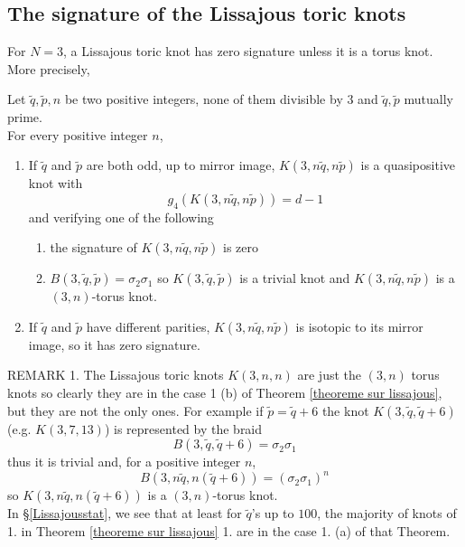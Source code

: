 \documentclass[12pt]{article}
\begin{document}
\subsection{The signature of the Lissajous toric knots}
For $N=3$, a Lissajous toric knot has zero signature unless it is a torus knot. More precisely,
\begin{thm}\label{theoreme sur lissajous}
	Let $\tilde{q},\tilde{p},n$ be two positive integers, none of them divisible by $3$ and $\tilde{q},\tilde{p}$ mutually prime.\\
	For every positive integer $n$,
	\begin{enumerate}
		\item If $\tilde{q}$ and $\tilde{p}$ are both odd, up to mirror image, $K(3,n\tilde{q},n\tilde{p})$ is a quasipositive knot with
		\begin{equation}\label{smooth genus} 
		g_4(K(3,n\tilde{q},n\tilde{p}))=d-1
		\end{equation}
		and verifying one of the following
		\begin{enumerate}
			\item 
			the signature of $K(3,n\tilde{q},n\tilde{p})$ is zero
			\item
			$B(3,\tilde{q},\tilde{p})=\sigma_2\sigma_1$ so $K(3,\tilde{q},\tilde{p})$ is a trivial knot and $K(3,n\tilde{q},n\tilde{p})$ is a $(3,n)$-torus knot.
		\end{enumerate}
		\item 
		If $\tilde{q}$ and $\tilde{p}$ have different parities, $K(3,n\tilde{q},n\tilde{p})$ is isotopic to its mirror image, so it has zero signature.  
	\end{enumerate}
	
\end{thm}


REMARK 1. The Lissajous toric knots $K(3,n,n)$ are just the $(3,n)$ torus knots so clearly they are in the case 1 (b) of Theorem \ref{theoreme sur lissajous}, but they are not the only ones. For example if $\tilde{p}=\tilde{q}+6$ the knot $K(3,\tilde{q},\tilde{q}+6)$ (e.g. $K(3,7,13)$) is represented by the braid  $$B(3,\tilde{q},\tilde{q}+6)=\sigma_2\sigma_1$$
thus it is trivial and, for a positive integer $n$, $$B(3,n\tilde{q},n(\tilde{q}+6))=(\sigma_2\sigma_1)^n$$ so $K(3,n\tilde{q},n(\tilde{q}+6))$ is a $(3,n)$-torus knot.\\
In \S \ref{Lissajousstat}, we see that at least for $\tilde{q}$'s up to $100$, the majority of knots of 1. in Theorem \ref{theoreme sur lissajous} 1. are in the case 1. (a) of that Theorem. \\
\end{document}
